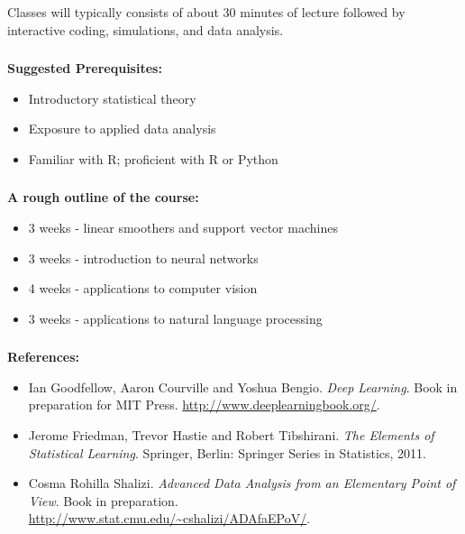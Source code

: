 \documentclass[xetex,mathserif,serif,aspectratio=169]{beamer}
\begin{document}
\begin{frame}[fragile] \frametitle{} \oldB \small

Classes will typically consists of about 30 minutes of lecture followed by
interactive coding, simulations, and data analysis.

\end{frame}

\begin{frame}[fragile] \frametitle{} \oldB \small

{\bf Suggested Prerequisites:}
\begin{itemize}\setlength\itemsep{0em}
\item Introductory statistical theory
\item Exposure to applied data analysis
\item Familiar with R; proficient with R or Python
\end{itemize}

\end{frame}

\begin{frame}[fragile] \frametitle{} \oldB \small

{\bf A rough outline of the course:}
\begin{itemize}\setlength\itemsep{0em}
\item 3 weeks - linear smoothers and support vector machines
\item 3 weeks - introduction to neural networks
\item 4 weeks - applications to computer vision
\item 3 weeks - applications to natural language processing
\end{itemize}

\end{frame}

\begin{frame}[fragile] \frametitle{} \oldB \small

{\bf References:}

\begin{itemize}\setlength\itemsep{0em}
\item Ian Goodfellow, Aaron Courville and Yoshua Bengio. \textit{Deep Learning}. Book in preparation for MIT Press. \url{http://www.deeplearningbook.org/}.
\item Jerome Friedman, Trevor Hastie and Robert Tibshirani. \textit{The Elements of Statistical Learning}. Springer, Berlin: Springer Series in Statistics, 2011.
\item Cosma Rohilla Shalizi. \textit{Advanced Data Analysis from an Elementary Point of View}. Book in preparation. \url{http://www.stat.cmu.edu/~cshalizi/ADAfaEPoV/}.
\end{itemize}

\end{frame}
\end{document}
